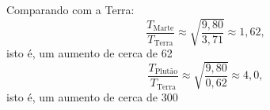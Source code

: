 Comparando com a Terra:
\[
\frac{T_{\text{Marte}}}{T_{\text{Terra}}} \approx \sqrt{\frac{9{,}80}{3{,}71}} \approx 1{,}62,
\]
isto é, um aumento de cerca de 62%
\[
\frac{T_{\text{Plutão}}}{T_{\text{Terra}}} \approx \sqrt{\frac{9{,}80}{0{,}62}} \approx 4{,}0,
\]
isto é, um aumento de cerca de 300%